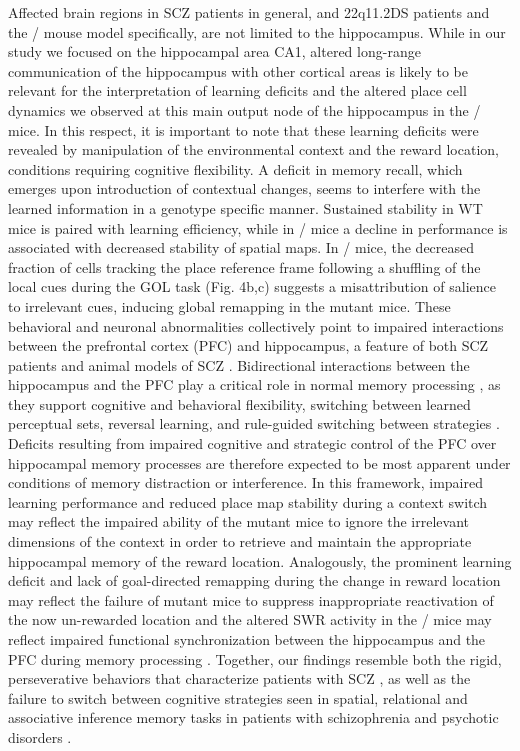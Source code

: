 Affected brain regions in SCZ patients in general, and 22q11.2DS patients and the \df/ mouse model specifically, are not limited to the hippocampus. While in our study we focused on the hippocampal area CA1, altered long-range communication of the hippocampus with other cortical areas is likely to be relevant for the interpretation of learning deficits and the altered place cell dynamics we observed at this main output node of the hippocampus in the \df/ mice. In this respect, it is important to note that these learning deficits were revealed by manipulation of the environmental context and the reward location, conditions requiring cognitive flexibility. A deficit in memory recall, which emerges upon introduction of contextual changes, seems to interfere with the learned information in a genotype specific manner. Sustained stability in WT mice is paired with learning efficiency, while in \df/ mice a decline in performance is associated with decreased stability of spatial maps. In \df/ mice, the decreased fraction of cells tracking the place reference frame following a shuffling of the local cues during the GOL task (Fig. 4b,c) suggests a misattribution of salience to irrelevant cues, inducing global remapping in the mutant mice. These behavioral and neuronal abnormalities collectively point to impaired interactions between the prefrontal cortex (PFC) and hippocampus, a feature of both SCZ patients and animal models of SCZ \citep{Sigurdsson2015, Mukai2015, Sigurdsson2010, Tamura2016}. Bidirectional interactions between the hippocampus and the PFC play a critical role in normal memory processing \citep{Eichenbaum2017, Navawongse2013, Place2016, Preston2013, Simons2003, Miller2001}, as they support cognitive and behavioral flexibility, switching between learned perceptual sets, reversal learning, and rule-guided switching between strategies \citep{Ragozzino1999a, Ragozzino1999b, Birrell2000, Mala2015, Floresco2008, Rich2007}. Deficits resulting from impaired cognitive and strategic control of the PFC over hippocampal memory processes are therefore expected to be most apparent under conditions of memory distraction or interference. In this framework, impaired learning performance and reduced place map stability during a context switch may reflect the impaired ability of the mutant mice to ignore the irrelevant dimensions of the context in order to retrieve and maintain the appropriate hippocampal memory of the reward location. Analogously, the prominent learning deficit and lack of goal-directed remapping during the change in reward location may reflect the failure of mutant mice to suppress inappropriate reactivation of the now un-rewarded location and the altered SWR activity in the \df/ mice may reflect impaired functional synchronization between the hippocampus and the PFC during memory processing \citep{Jadhav2016, Jones2005, Peyrache2011, Siapas2005, Sigurdsson2010, Wierzynski2009}. Together, our findings resemble both the rigid, perseverative behaviors that characterize patients with SCZ \citep{Crider1997, Leeson2009, Morice1990}, as well as the failure to switch between cognitive strategies seen in spatial, relational and associative inference memory tasks in patients with schizophrenia and psychotic disorders \citep{Armstrong2012, Colgin2008, Hanlon2006, Sheffield2012, Wilkins2013}.

